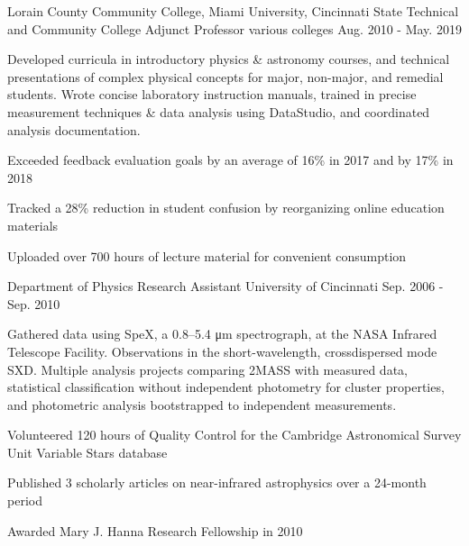 \begin{cventries}
  \cventry
    {Lorain County Community College, Miami University, Cincinnati State Technical and Community College} %
    {Adjunct Professor} %
    {various colleges} %
    {Aug. 2010 - May. 2019} %
    {
      \begin{cvparagraph}
        Developed curricula in introductory physics \& astronomy courses, and technical presentations of complex physical concepts for major, non-major, and remedial students.  Wrote concise laboratory instruction manuals, trained in precise measurement techniques \& data analysis using DataStudio, and coordinated analysis documentation.
      \end{cvparagraph}
      \begin{cvitems} %
        \item {Exceeded feedback evaluation goals by an average of 16\% in 2017 and by 17\% in 2018}
        \item {Tracked a 28\% reduction in student confusion by reorganizing online education materials}
        \item {Uploaded over 700 hours of lecture material for convenient consumption}
      \end{cvitems}
    }

  \cventry
    {Department of Physics}
    {Research Assistant} %
    {University of Cincinnati}
    {Sep. 2006 - Sep. 2010}
    {
      \begin{cvparagraph}
        Gathered data using SpeX, a 0.8–5.4 μm spectrograph, at the NASA Infrared Telescope Facility.  Observations in the short-wavelength, crossdispersed mode SXD.  Multiple analysis projects comparing 2MASS with measured data, statistical classification without independent photometry for cluster properties, and photometric analysis bootstrapped to independent measurements.
      \end{cvparagraph}
      \begin{cvitems} %
        \item {Volunteered 120 hours of Quality Control for the Cambridge Astronomical Survey Unit Variable Stars database}
        \item {Published 3 scholarly articles on near-infrared astrophysics over a 24-month period}
        \item {Awarded Mary J. Hanna Research Fellowship in 2010}
      \end{cvitems}
    }

\end{cventries}
